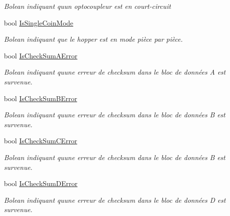 \begin{DoxyCompactItemize}
\begin{DoxyCompactList}\small\item\em Bolean indiquant qu\textquotesingle{}un optocoupleur est en court-\/circuit \end{DoxyCompactList}\item 
bool \mbox{\hyperlink{class_device_library_1_1_c_hopper_ac8bdea555bab297e4533885935005ad9}{Is\+Single\+Coin\+Mode}}
\begin{DoxyCompactList}\small\item\em Bolean indiquant que le hopper est en mode pièce par pièce. \end{DoxyCompactList}\item 
bool \mbox{\hyperlink{class_device_library_1_1_c_hopper_ab6b53cde806c99f06e7ab4e51044c68c}{Is\+Check\+Sum\+A\+Error}}
\begin{DoxyCompactList}\small\item\em Bolean indiquant qu\textquotesingle{}une erreur de checksum dans le bloc de données A est survenue. \end{DoxyCompactList}\item 
bool \mbox{\hyperlink{class_device_library_1_1_c_hopper_a97fc7f01be900cd25941c1cc0d1ff053}{Is\+Check\+Sum\+B\+Error}}
\begin{DoxyCompactList}\small\item\em Bolean indiquant qu\textquotesingle{}une erreur de checksum dans le bloc de données B est survenue. \end{DoxyCompactList}\item 
bool \mbox{\hyperlink{class_device_library_1_1_c_hopper_abcd01eec19d5cefaaf8f7a8a748777c1}{Is\+Check\+Sum\+C\+Error}}
\begin{DoxyCompactList}\small\item\em Bolean indiquant qu\textquotesingle{}une erreur de checksum dans le bloc de données B est survenue. \end{DoxyCompactList}\item 
bool \mbox{\hyperlink{class_device_library_1_1_c_hopper_af21105cacff9feef51796a71f1066d6c}{Is\+Check\+Sum\+D\+Error}}
\begin{DoxyCompactList}\small\item\em Bolean indiquant qu\textquotesingle{}une erreur de checksum dans le bloc de données D est survenue. \end{DoxyCompactList}\item 

\end{DoxyCompactItemize}
